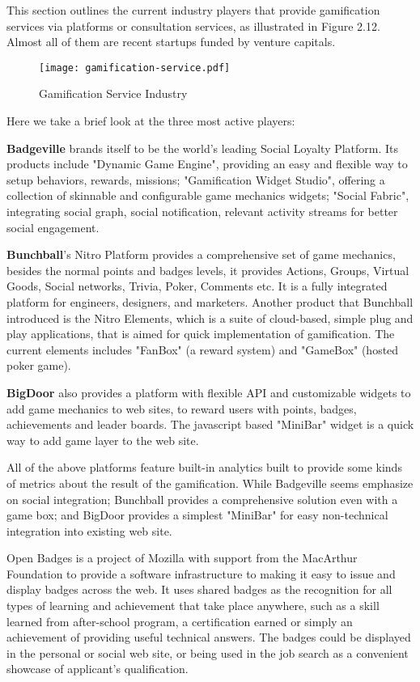This section outlines the current industry players that provide gamification services via platforms or consultation services, as illustrated in Figure 2.12. Almost all of them are recent startups funded by venture capitals.

\begin{figure}[htbp]
	\centering
		\texttt{[image: gamification-service.pdf]}
		\caption{Gamification Service Industry}
		\label{fig:gamification-service}
\end{figure}

Here we take a brief look at the three most active players:

{\bf Badgeville} \cite {badgeville} brands itself to be the world's leading Social Loyalty Platform. Its products include "Dynamic Game Engine", providing an easy and flexible way to setup behaviors, rewards, missions; "Gamification Widget Studio", offering a collection of skinnable and configurable game mechanics widgets; "Social Fabric", integrating social graph, social notification, relevant activity streams for better social engagement. 
    
{\bf Bunchball}'s \cite {bunchball} Nitro Platform provides a comprehensive set of game mechanics, besides the normal points and badges levels, it provides Actions, Groups, Virtual Goods, Social networks, Trivia, Poker, Comments etc. It is a fully integrated platform for engineers, designers, and marketers. Another product that Bunchball introduced is the Nitro Elements, which is a suite of cloud-based, simple plug and play applications, that is aimed for quick implementation of gamification. The current elements includes "FanBox" (a reward system) and "GameBox" (hosted poker game).

{\bf BigDoor}  \cite {bigdoor} also provides a platform with flexible API and customizable widgets to add game mechanics to web sites, to reward users with points, badges, achievements and leader boards. The javascript based "MiniBar" widget is a quick way to add game layer to the web site. 

All of the above platforms feature built-in analytics built to provide some kinds of  metrics about the result of the gamification. While Badgeville seems emphasize on social integration; Bunchball provides a comprehensive solution even with a game box; and BigDoor provides a simplest "MiniBar" for easy non-technical integration into existing web site.

Open Badges \cite {openbadges}  is a project of Mozilla with support from the MacArthur Foundation to provide a software infrastructure to making it easy to issue and display badges across the web. It uses shared badges as the recognition for all types of learning and achievement that take place anywhere, such as a skill learned from after-school program, a certification earned or simply an achievement of providing useful technical answers. The badges could be displayed in the personal or social web site, or being used in the job search as a convenient showcase of applicant's qualification.

